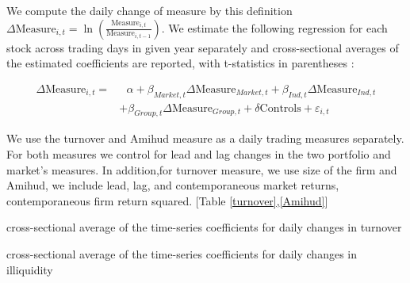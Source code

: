 \documentclass[12pt, a4paper]{article}
\begin{document}
 We compute the daily change of measure by this definition $ \Delta \text{Measure}_{i,t} = \ln(\frac{\text{Measure}_{i,t}}{\text{Measure}_{i,t-1}}) $. 
We estimate the following regression for each stock across trading days in given year separately and cross-sectional averages of the estimated coefficients are reported, with t-statistics in parentheses :

\begin{equation*}
	\begin{split}
			\Delta \text{Measure}_{i,t} =  & \text{	}\alpha + \beta_{Market,t} \Delta \text{Measure}_{Market,t}  
		+ \beta_{Ind,t} \Delta \text{Measure}_{Ind,t} \\ & + \beta_{Group,t} \Delta \text{Measure}_{Group,t} + \delta\text{Controls} + \varepsilon_{i,t}
	\end{split}
\end{equation*}

We use the turnover and Amihud measure as a daily trading measures separately. For both measures we control for lead and lag changes in the two portfolio  and market's measures. In addition,for turnover measure, we use size of the firm and  Amihud, we include lead, lag, and contemporaneous market returns, contemporaneous firm return squared. [Table \ref{turnover},\ref{Amihud}]

	\begin{table}[htbp]
	\centering
	\caption{cross-sectional average of the time-series coefficients for daily changes in turnover }
	\resizebox{0.7\textheight}{!}{
		
	} \label{turnover}
\end{table}


	\begin{table}[htbp]
	\centering
	\caption{cross-sectional average of the time-series coefficients for daily changes in illiquidity  }
	\resizebox{0.7\textheight}{!}{
		\centering
		
	}
\label{Amihud}
\end{table}
\end{document}
